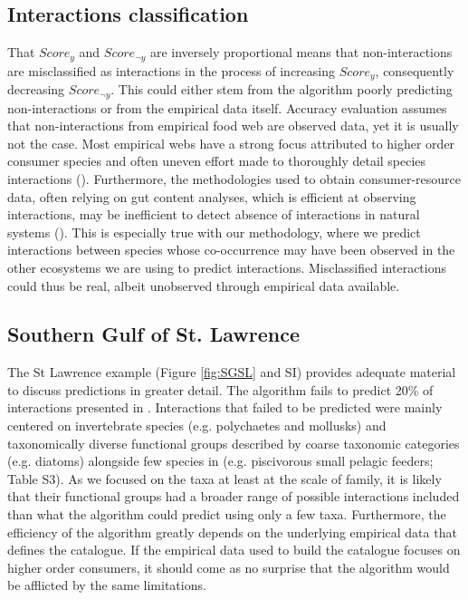 \subsection{Interactions classification}
That $Score_{y}$ and $Score_{\neg y}$ are inversely proportional means that non-interactions are misclassified as interactions in the process of increasing $Score_y$, consequently decreasing $Score_{\neg y}$. This could either stem from the algorithm poorly predicting non-interactions or from the empirical data itself. Accuracy evaluation assumes that non-interactions from empirical food web are observed data, yet it is usually not the case. Most empirical webs have a strong focus attributed to higher order consumer species and often uneven effort made to thoroughly detail species interactions (\cite{dunne2006}). Furthermore, the methodologies used to obtain consumer-resource data, often relying on gut content analyses, which is efficient at observing interactions, may be inefficient to detect absence of interactions in natural systems (\cite{dunne2006}). This is especially true with our methodology, where we predict interactions between species whose co-occurrence may have been observed in the other ecosystems we are using to predict interactions. Misclassified interactions could thus be real, albeit unobserved through empirical data available.

\subsection{Southern Gulf of St. Lawrence}
The St Lawrence example (Figure \ref{fig:SGSL} and SI) provides adequate material to discuss predictions in greater detail. The algorithm fails to predict 20\% of interactions presented in \citet{savenkoff2004}. Interactions that failed to be predicted were mainly centered on invertebrate species (e.g. polychaetes and mollusks) and taxonomically diverse functional groups described by coarse taxonomic categories (e.g. diatoms) alongside few species in \citet{savenkoff2004} (e.g. piscivorous small pelagic feeders; Table S3). As we focused on the taxa at least at the scale of family, it is likely that their functional groups had a broader range of possible interactions included than what the algorithm could predict using only a few taxa. Furthermore, the efficiency of the algorithm greatly depends on the underlying empirical data that defines the catalogue. If the empirical data used to build the catalogue focuses on higher order consumers, it should come as no surprise that the algorithm would be afflicted by the same limitations.

